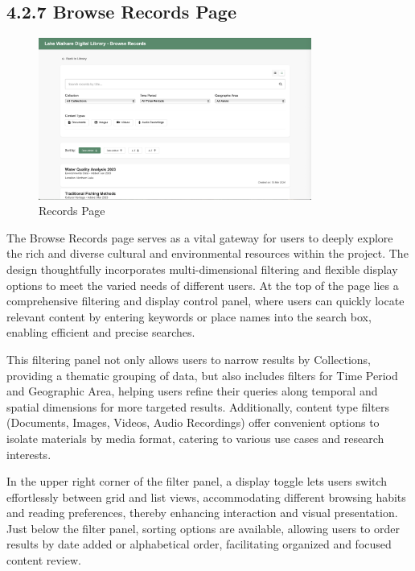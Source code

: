 \subsection*{4.2.7 Browse Records Page}
\begin{figure}[H]
    \centering
    \includegraphics[width=0.8\textwidth]{screenshot/prototype_records.png}
    \caption{Records Page}
    \label{fig:architecture}
\end{figure}

The Browse Records page serves as a vital gateway for users to deeply explore the rich and diverse cultural and environmental resources within the project. The design thoughtfully incorporates multi-dimensional filtering and flexible display options to meet the varied needs of different users. At the top of the page lies a comprehensive filtering and display control panel, where users can quickly locate relevant content by entering keywords or place names into the search box, enabling efficient and precise searches.

This filtering panel not only allows users to narrow results by Collections, providing a thematic grouping of data, but also includes filters for Time Period and Geographic Area, helping users refine their queries along temporal and spatial dimensions for more targeted results. Additionally, content type filters (Documents, Images, Videos, Audio Recordings) offer convenient options to isolate materials by media format, catering to various use cases and research interests.

In the upper right corner of the filter panel, a display toggle lets users switch effortlessly between grid and list views, accommodating different browsing habits and reading preferences, thereby enhancing interaction and visual presentation. Just below the filter panel, sorting options are available, allowing users to order results by date added or alphabetical order, facilitating organized and focused content review.

